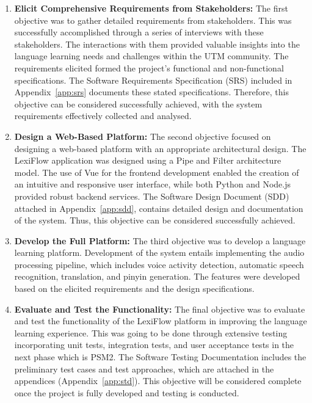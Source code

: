 \documentclass[oneside]{utmthesis}
\begin{document}
\begin{enumerate}[label= (\alph*)]
    \item \textbf{Elicit Comprehensive Requirements from Stakeholders:} The first objective was to gather detailed requirements from stakeholders. This was successfully accomplished through a series of interviews with these stakeholders. The interactions with them provided valuable insights into the language learning needs and challenges within the UTM community. The requirements elicited formed the project’s functional and non-functional specifications. The Software Requirements Specification (SRS) included in Appendix~\ref{app:srs} documents these stated specifications. Therefore, this objective can be considered successfully achieved, with the system requirements effectively collected and analysed.
    \item \textbf{Design a Web-Based Platform:} The second objective focused on designing a web-based platform with an appropriate architectural design. The LexiFlow application was designed using a  Pipe and Filter architecture model. The use of Vue for the frontend development enabled the creation of an intuitive and responsive user interface, while both Python and Node.js provided robust backend services. The Software Design Document (SDD) attached in Appendix~\ref{app:sdd}, contains detailed design and documentation of the system. Thus, this objective can be considered successfully achieved.
    \item \textbf{Develop the Full Platform:} The third objective was to develop a language learning platform. Development of the system entails implementing the audio processing pipeline, which includes voice activity detection, automatic speech recognition, translation, and pinyin generation. The features were developed based on the elicited requirements and the design specifications.
    \item \textbf{Evaluate and Test the Functionality:} The final objective was to evaluate and test the functionality of the LexiFlow platform in improving the language learning experience. This was going to be done through extensive testing incorporating unit tests, integration tests, and user acceptance tests in the next phase which is PSM2. The Software Testing Documentation includes the preliminary test cases and test approaches, which are attached in the appendices (Appendix~\ref{app:std}). This objective will be considered complete once the project is fully developed and testing is conducted.
\end{enumerate}
\end{document}
